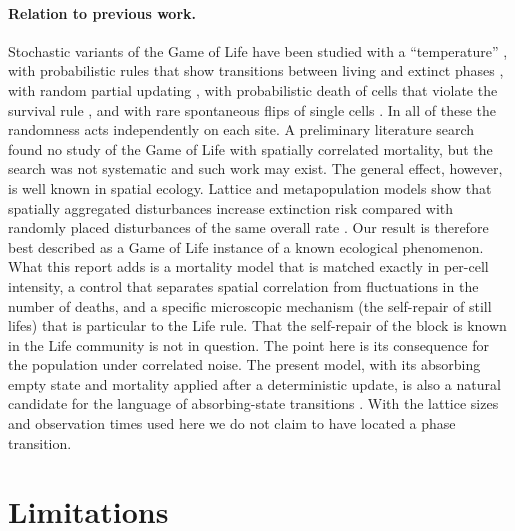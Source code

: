 \documentclass[11pt,a4paper]{article}
\begin{document}
\paragraph{Relation to previous work.} Stochastic variants of the Game of Life have been studied with a ``temperature'' \cite{schulman1978}, with probabilistic rules that show transitions between living and extinct phases \cite{monetti1995,nordfalk1996}, with random partial updating \cite{blok1999}, with probabilistic death of cells that violate the survival rule \cite{yaroslavsky2013}, and with rare spontaneous flips of single cells \cite{vidunas2025}. In all of these the randomness acts independently on each site. A preliminary literature search found no study of the Game of Life with spatially correlated mortality, but the search was not systematic and such work may exist. The general effect, however, is well known in spatial ecology. Lattice and metapopulation models show that spatially aggregated disturbances increase extinction risk compared with randomly placed disturbances of the same overall rate \cite{kallimanis2005,liao2015}. Our result is therefore best described as a Game of Life instance of a known ecological phenomenon. What this report adds is a mortality model that is matched exactly in per-cell intensity, a control that separates spatial correlation from fluctuations in the number of deaths, and a specific microscopic mechanism (the self-repair of still lifes) that is particular to the Life rule. That the self-repair of the block is known in the Life community is not in question. The point here is its consequence for the population under correlated noise. The present model, with its absorbing empty state and mortality applied after a deterministic update, is also a natural candidate for the language of absorbing-state transitions \cite{hinrichsen2000}. With the lattice sizes and observation times used here we do not claim to have located a phase transition.

\section{Limitations}
\end{document}
